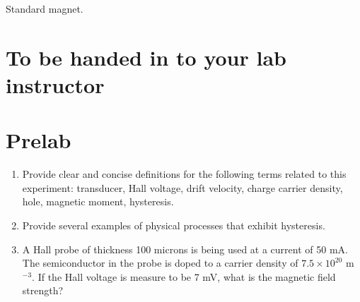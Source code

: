 \begin{marginfigure}
\caption{Standard magnet.}
\label{fig:he7}
\end{marginfigure}

\section{To be handed in to your lab instructor}

\section{Prelab}
\begin{enumerate}

\item Provide clear and concise definitions for the following terms related to this experiment: transducer, Hall voltage, drift velocity, charge carrier density, hole, magnetic moment, hysteresis.

\item Provide several examples of physical processes that exhibit hysteresis.

\item A Hall probe of thickness 100 microns is being used at a current of 50 mA.  The semiconductor in the probe is doped to a carrier density of $7.5\times10^{20}$ m$^{-3}$.  If the Hall voltage is measure to be 7 mV, what is the magnetic field strength?
\end{enumerate}

